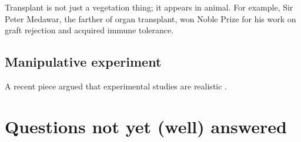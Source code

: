 \documentclass[letterpaper, 10pt]{article}
\begin{document}
Transplant is not just a vegetation thing; it appears in animal. For example, Sir Peter Medawar, the farther of
organ transplant, won Noble Prize for his work on graft rejection and acquired immune tolerance.

\subsection{Manipulative experiment}
A recent piece argued that experimental studies are realistic \citep{jochum2020results}.

\section{Questions not yet (well) answered}



\end{document}
